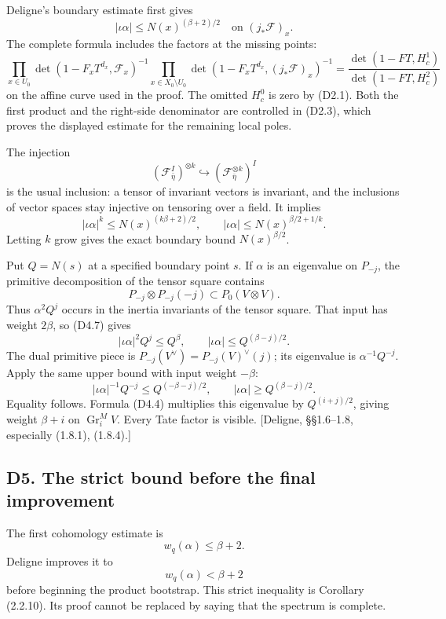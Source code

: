 Deligne's boundary estimate first gives \[
|\iota\alpha|\le N(x)^{(\beta+2)/2}
\quad\text{on }(j_*\mathcal F)_x.
\] The complete formula includes the factors at the missing points: \[
\prod_{x\in U_0}\det(1-F_xT^{d_x},\mathcal F_x)^{-1}
\prod_{x\in X_0\setminus U_0}
\det(1-F_xT^{d_x},(j_*\mathcal F)_x)^{-1}
=\frac{\det(1-FT,H_c^1)}
{\det(1-FT,H_c^2)}
\tag{D4.5}
\] on the affine curve used in the proof. The omitted \(H_c^0\) is zero
by (D2.1). Both the first product and the right-side denominator are
controlled in (D2.3), which proves the displayed estimate for the
remaining local poles.

The injection \[
(\mathcal F_{\bar\eta}^{I})^{\otimes k}
\hookrightarrow(\mathcal F_{\bar\eta}^{\otimes k})^{I}
\tag{D4.6}
\] is the usual inclusion: a tensor of invariant vectors is invariant,
and the inclusions of vector spaces stay injective on tensoring over a
field. It implies \[
|\iota\alpha|^k\le N(x)^{(k\beta+2)/2},
\qquad
|\iota\alpha|\le N(x)^{\beta/2+1/k}.
\tag{D4.7}
\] Letting \(k\) grow gives the exact boundary bound \(N(x)^{\beta/2}\).

Put \(Q=N(s)\) at a specified boundary point \(s\). If \(\alpha\) is an
eigenvalue on \(P_{-j}\), the primitive decomposition of the tensor
square contains \[
P_{-j}\otimes P_{-j}(-j)\subset
P_0(V\otimes V).
\tag{D4.8}
\] Thus \(\alpha^2Q^j\) occurs in the inertia invariants of the tensor
square. That input has weight \(2\beta\), so (D4.7) gives \[
|\iota\alpha|^2Q^j\le Q^\beta,
\qquad |\iota\alpha|\le Q^{(\beta-j)/2}.
\tag{D4.9}
\] The dual primitive piece is \(P_{-j}(V^\vee)=P_{-j}(V)^\vee(j)\); its
eigenvalue is \(\alpha^{-1}Q^{-j}\). Apply the same upper bound with
input weight \(-\beta\): \[
|\iota\alpha|^{-1}Q^{-j}\le Q^{(-\beta-j)/2},
\qquad |\iota\alpha|\ge Q^{(\beta-j)/2}.
\tag{D4.10}
\] Equality follows. Formula (D4.4) multiplies this eigenvalue by
\(Q^{(i+j)/2}\), giving weight \(\beta+i\) on
\(\operatorname{Gr}_i^MV\). Every Tate factor is visible. {[}Deligne,
§§1.6--1.8, especially (1.8.1), (1.8.4).{]}

\subsection{D5. The strict bound before the final
improvement}\label{d5.-the-strict-bound-before-the-final-improvement}

The first cohomology estimate is \[
w_q(\alpha)\le\beta+2.
\tag{D5.1}
\] Deligne improves it to \[
w_q(\alpha)<\beta+2
\tag{D5.2}
\] before beginning the product bootstrap. This strict inequality is
Corollary (2.2.10). Its proof cannot be replaced by saying that the
spectrum is complete.

